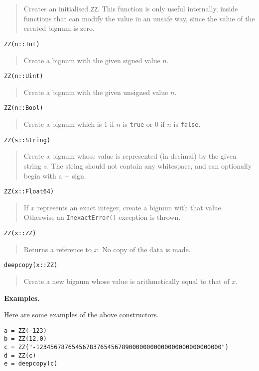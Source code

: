 \documentclass[a4paper,10pt]{article}
\newcommand{\code}{\lstinline}
\newcommand{\desc}[1]{\vspace{-3mm}\begin{quote}#1\end{quote}}
\begin{document}
{\desc{Creates an initialised \code{ZZ}. This function is only useful internally, 
inside functions that can modify the value in an unsafe way, since the value of the
created bignum is zero.}

\begin{lstlisting}
ZZ(n::Int)
\end{lstlisting}

\desc{Create a bignum with the given signed value $n$.}

\begin{lstlisting}
ZZ(n::Uint)
\end{lstlisting}

\desc{Create a bignum with the given unsigned value $n$.}

\begin{lstlisting}
ZZ(n::Bool)
\end{lstlisting}

\desc{Create a bignum which is $1$ if $n$ is \code{true} or $0$ if $n$ is 
\code{false}.}

\begin{lstlisting}
ZZ(s::String)
\end{lstlisting}

\desc{Create a bignum whose value is represented (in decimal) by the given string
$s$. The string should not contain any whitespace, and can optionally begin with
a $-$ sign.}

\begin{lstlisting}
ZZ(x::Float64)
\end{lstlisting}

\desc{If $x$ represents an exact integer, create a bignum with that value. Otherwise
an \code{InexactError()} exception is thrown.}

\begin{lstlisting}
ZZ(x::ZZ)
\end{lstlisting}

\desc{Returns a reference to $x$. No copy of the data is made.}

\begin{lstlisting}
deepcopy(x::ZZ)
\end{lstlisting}

\desc{Create a new bignum whose value is arithmetically equal to that of $x$.}

\textbf{Examples.}

Here are some examples of the above constructors.

\begin{lstlisting}
a = ZZ(-123)
b = ZZ(12.0)
c = ZZ("-1234567876545678376545678900000000000000000000000000")
d = ZZ(c)
e = deepcopy(c)
\end{lstlisting}

}
\end{document}
